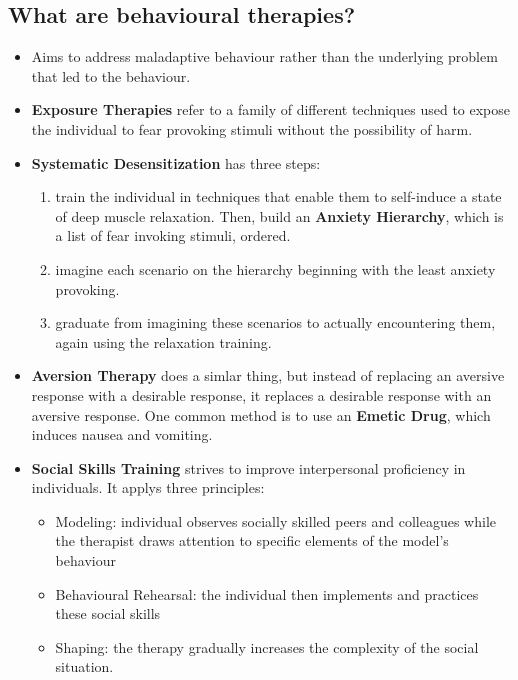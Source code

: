 \documentclass[10pt,letter]{article}
\theoremstyle{plain}
\theoremstyle{definition}
\begin{document}
\subsection*{What are behavioural therapies?}
\begin{itemize}
    \item Aims to address maladaptive behaviour rather than the underlying problem that led to the behaviour. 
    \item \textbf{Exposure Therapies} refer to a family of different techniques used to expose the individual to fear provoking stimuli without the possibility of harm. 
    \item \textbf{Systematic Desensitization} has three steps: \begin{enumerate}[label=Step \arabic*)]
        \item train the individual in techniques that enable them to self-induce a state of deep muscle relaxation. Then, build an \textbf{Anxiety Hierarchy}, which is a list of fear invoking stimuli, ordered. 
        \item imagine each scenario on the hierarchy beginning with the least anxiety provoking. 
            \item graduate from imagining these scenarios to actually encountering them, again using the relaxation training. 
    \end{enumerate}
    \item \textbf{Aversion Therapy} does a simlar thing, but instead of replacing an aversive response with a desirable response, it replaces a desirable response with an aversive response. One common method is to use an \textbf{Emetic Drug}, which induces nausea and vomiting. 
    \item \textbf{Social Skills Training} strives to improve interpersonal proficiency in individuals. It applys three principles: \begin{itemize}
        \item Modeling: individual observes socially skilled peers and colleagues while the therapist draws attention to specific elements of the model's behaviour 
        \item Behavioural Rehearsal: the individual then implements and practices these social skills 
        \item Shaping: the therapy gradually increases the complexity of the social situation. 
    \end{itemize}
\end{itemize}
\end{document}
